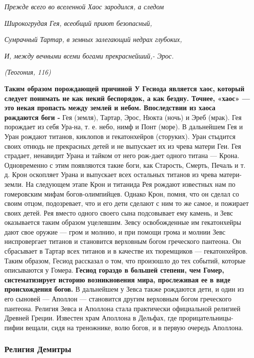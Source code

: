     \textit{Прежде всего во вселенной Хаос зародился, а следом }
    \par \textit{Широкогрудая Гея, всеобщий приют безопасный,} 
    \par \textit{Сумрачный Тартар, в земных залегающий недрах глубоких, }
    \par \textit{И, между вечными всеми богами прекраснейший,- Эрос. }
    \par \textit{ (Теогония, 116)}
     
    \par \textbf{Таким образом порождающей причиной У Гесиода является хаос, который следует понимать
	не как некий беспорядок, а как бездну. Точнее, «хаос» — это некая пропасть между землей
    и небом. Впоследствии из хаоса рождаются боги - } Гея (земля), Тартар, Эрос, Нюкта 
	(ночь) и Эреб (мрак). Гея порождает из себя Ура-на, т. е. небо, нимф и Понт (море). 
    В дальнейшем Гея и
	Уран рождают титанов, киклопов и гекатонхейров (сторуких). Уран стыдится своих
    отнюдь не прекрасных детей и не выпускает их из чрева матери Геи. Гея страдает, 
	ненавидит Урана и тайком от него рож-дает одного титана — Крона. Одновременно 
	с этим появляются такие боги, как Старость, Смерть, Печаль и т. д. Крон оскопляет 
	Урана и выпускает всех остальных титанов из чрева матери-земли.
	На следующем этапе Крон и титанида Рея рождают известных нам по гомеровским
	мифам богов-олимпийцев. Однако Крон, помня, что он сделал со своим отцом, 
	подозревает, что и его дети сделают с ним то же самое, и пожирает своих детей.
	Рея вместо одного своего сына подсовывает ему камень, и Зевс оказывается 
	таким образом уцелевшим. Зевсу освобожденные им гекатонхейры дают свое оружие — 
	гром и молнию, и при помощи грома и молнии Зевс ниспровергает титанов и 
	становится верховным богом греческого пантеона. Он сбрасывает в Тартар всех 
	титанов и в качестве их тюремщиков — гекатонхейров. 
	Таким образом, Гесиод рассказал о том, что произошло до тех событий, которые 
	описываются у Гомера. \textbf{Гесиод гораздо в большей степени, чем Гомер, 
	систематизирует историю возникновения мира, прослеживая ее в виде происхождения богов.}
	В дальнейшем у Зевса также рождаются дети, и один из его сыновей — Аполлон — 
	становится другим верховным богом греческого пантеона. Религия Зевса и Аполлона 
	стала практически официальной религией Древней Греции. Известен храм Аполлона в 
	Дельфах, где прорицательницы-пифии вещали, сидя на треножнике, волю богов, и в 
	первую очередь Аполлона.

	\subsubsection{Религия Демитры}

